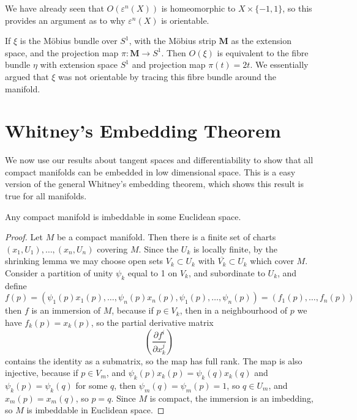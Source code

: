 \begin{example}
    We have already seen that $O(\varepsilon^n(X))$ is homeomorphic to $X \times \{ -1, 1 \}$, so this provides an argument as to why $\varepsilon^n(X)$ is orientable.
\end{example}

\begin{example}
    If $\xi$ is the M\"{o}bius bundle over $S^1$, with the M\"{o}bius strip $\mathbf{M}$ as the extension space, and the projection map $\pi: \mathbf{M} \to S^1$. Then $O(\xi)$ is equivalent to the fibre bundle $\eta$ with extension space $S^1$ and projection map $\pi(t) = 2t$. We essentially argued that $\xi$ was not orientable by tracing this fibre bundle around the manifold.
\end{example}

\section{Whitney's Embedding Theorem}

We now use our results about tangent spaces and differentiability to show that all compact manifolds can be embedded in low dimensional space. This is a easy version of the general Whitney's embedding theorem, which shows this result is true for all manifolds.

\begin{lemma}
    Any compact manifold is imbeddable in some Euclidean space.
\end{lemma}
\begin{proof}
    Let $M$ be a compact manifold. Then there is a finite set of charts $(x_1,U_1), \dots, (x_n,U_n)$ covering $M$. Since the $U_k$ is locally finite, by the shrinking lemma we may choose open sets $V_k \subset U_k$ with $\overline{V_k} \subset U_k$ which cover $M$. Consider a partition of unity $\psi_k$ equal to 1 on $V_k$, and subordinate to $U_k$, and define
    \[ f(p) = (\psi_1(p) x_1(p), \dots, \psi_n(p) x_n(p), \psi_1(p), \dots, \psi_n(p)) = (f_1(p), \dots, f_n(p)) \]
    then $f$ is an immersion of $M$, because if $p \in V_k$, then in a neighbourhood of $p$ we have $f_k(p) = x_k(p)$, so the partial derivative matrix
    \[ \left( \frac{\partial f^i}{\partial x_k^j} \right) \]
    contains the identity as a submatrix, so the map has full rank. The map is also injective, because if $p \in V_m$, and $\psi_k(p) x_k(p) = \psi_k(q) x_k(q)$ and $\psi_k(p) = \psi_k(q)$ for some $q$, then $\psi_m(q) = \psi_m(p) = 1$, so $q \in U_m$, and $x_m(p) = x_m(q)$, so $p = q$. Since $M$ is compact, the immersion is an imbedding, so $M$ is imbeddable in Euclidean space.
\end{proof}

